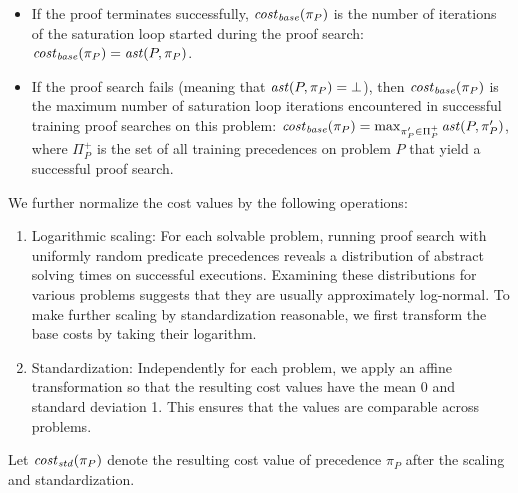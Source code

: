 \documentclass{ceurart}
\begin{document}
\begin{itemize}
	\item If the proof terminates successfully,
	\(\operatorname{\mathit{\operatorname{\mathit{cost}}_{base}}}(\pi_P)\) is the number of iterations of the saturation loop
	started during the proof search: \(\operatorname{\mathit{\operatorname{\mathit{cost}}_{base}}}(\pi_P) = \operatorname{\mathit{ast}}(P, \pi_P)\).
	\item If the proof search fails (meaning that \(\operatorname{\mathit{ast}}(P, \pi_P) = \bot\)),
	then \(\operatorname{\mathit{\operatorname{\mathit{cost}}_{base}}}(\pi_P)\) is the maximum number
	of saturation loop iterations encountered in successful training proof searches on this problem:
	\(\operatorname{\mathit{\operatorname{\mathit{cost}}_{base}}}(\pi_P) = \max_{\pi_P' \in \Pi^+_P} \operatorname{\mathit{ast}}(P, \pi_P')\),
	where \(\Pi^+_P\) is the set of all training precedences on problem \(P\)
	that yield a successful proof search.
\end{itemize}
We further normalize the cost values by the following operations:
\begin{enumerate}
	\item Logarithmic scaling:
	For each solvable problem, running proof search with uniformly random predicate precedences
	reveals a distribution of abstract solving times on successful executions.
	Examining these distributions for various problems suggests that they are usually
	approximately log-normal.
	To make further scaling by standardization reasonable,
	we first transform the base costs by taking their logarithm.
	\item Standardization: %
	Independently for each problem,
	we apply an affine transformation so that the resulting cost values
	have the mean 0 and standard deviation 1.
	This ensures that the values are comparable across problems.
\end{enumerate}
Let \(\operatorname{\mathit{\operatorname{\mathit{cost}}_{std}}}(\pi_P)\) denote the resulting cost value of precedence \(\pi_P\)
after the scaling and standardization.
\end{document}
